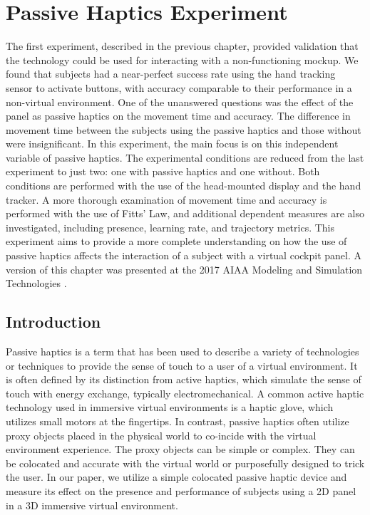\chapter{Passive Haptics Experiment}
\label{chap:ph_exp}

The first experiment, described in the previous chapter, provided validation that the technology could be used for interacting with a non-functioning mockup.
We found that subjects had a near-perfect success rate using the hand tracking sensor to activate buttons, with accuracy comparable to their performance in a non-virtual environment.
One of the unanswered questions was the effect of the panel as passive haptics on the movement time and accuracy.
The difference in movement time between the subjects using the passive haptics and those without were insignificant.
In this experiment, the main focus is on this independent variable of passive haptics.
The experimental conditions are reduced from the last experiment to just two: one with passive haptics and one without.
Both conditions are performed with the use of the head-mounted display and the hand tracker.
A more thorough examination of movement time and accuracy is performed with the use of Fitts' Law, and additional dependent measures are also investigated, including presence, learning rate, and trajectory metrics.
This experiment aims to provide a more complete understanding on how the use of passive haptics affects the interaction of a subject with a virtual cockpit panel.
A version of this chapter was presented at the 2017 AIAA Modeling and Simulation Technologies \citep{joyce_passive_2017}.

\section{Introduction}

Passive haptics is a term that has been used to describe a variety of technologies or techniques to provide the sense of touch to a user of a virtual environment.
It is often defined by its distinction from active haptics, which simulate the sense of touch with energy exchange, typically electromechanical.
A common active haptic technology used in immersive virtual environments is a haptic glove, which utilizes small motors at the fingertips.
In contrast, passive haptics often utilize proxy objects placed in the physical world to co-incide with the virtual environment experience.
The proxy objects can be simple or complex.
They can be colocated and accurate with the virtual world or purposefully designed to trick the user.
In our paper, we utilize a simple colocated passive haptic device and measure its effect on the presence and performance of subjects using a 2D panel in a 3D immersive virtual environment.

